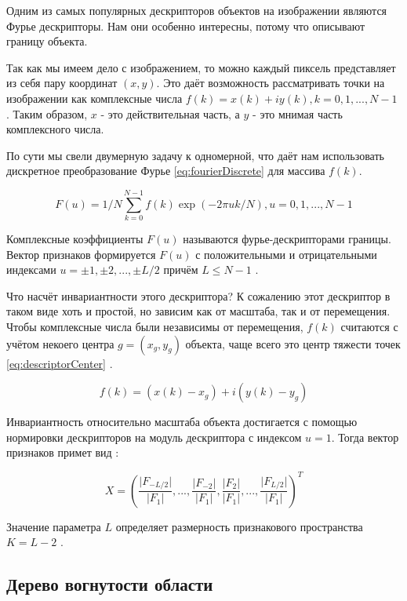 Одним из самых популярных дескрипторов объектов на изображении являются Фурье дескрипторы. Нам они особенно интересны, потому что описывают границу объекта.

Так как мы имеем дело с изображением, то можно каждый пиксель представляет из себя пару координат $(x, y)$. Это даёт возможность рассматривать точки на изображении как комплексные числа $f(k) = x(k) + iy(k), k = 0,1,...,N-1$ \cite{kolyuchkin2013visionAlgorithms}. Таким образом, $x$ - это действительная часть, а $y$ - это мнимая часть комплексного числа.

По сути мы свели двумерную задачу к одномерной, что даёт нам использовать дискретное преобразование Фурье \eqref{eq:fourierDiscrete} для массива $f(k)$.

\begin{equation}\label{eq:fourierDiscrete}
F(u) = 1/N \sum_{k=0}^{N-1} f(k) \exp(- 2\pi u k / N), u = 0,1,...,N-1
\end{equation}

Комплексные коэффициенты $F(u)$ называются фурье-дескрипторами границы. Вектор признаков формируется $F(u)$ с положительными и отрицательными индексами $u = \pm 1 ,\pm 2, ..., \pm L/2$ причём $L \leq N-1$ \cite{kolyuchkin2013visionAlgorithms}.

Что насчёт инвариантности этого дескриптора? К сожалению этот дескриптор в таком виде хоть и простой, но зависим как от масштаба, так и от перемещения. Чтобы комплексные числа были независимы от перемещения, $f(k)$ считаются с учётом некоего центра $g=(x_g,y_g)$ объекта, чаще всего это центр тяжести точек \eqref{eq:descriptorCenter} \cite{thang2010fourier}.

\begin{equation}\label{eq:descriptorCenter}
f(k)=(x(k)-x_g)+i(y(k)-y_g)
\end{equation}

Инвариантность относительно масштаба объекта достигается с помощью нормировки дескрипторов на модуль дескриптора с индексом $u=1$. Тогда вектор признаков примет вид \cite{kolyuchkin2013visionAlgorithms}:

\[
X=\left(\frac{\lvert{F_{-L/2}}\rvert}{\lvert{F_1}\rvert},...,\frac{\lvert{F_{-2}}\rvert}{\lvert{F_1}\rvert},\frac{\lvert{F_2}\rvert}{\lvert{F_1}\rvert},...,\frac{\lvert{F_{L/2}}\rvert}{\lvert{F_1}\rvert}\right)^T
\]

Значение параметра $L$ определяет размерность признакового пространства $K=L-2$ \cite{kolyuchkin2013visionAlgorithms}.

\subsection{Дерево вогнутости области}

